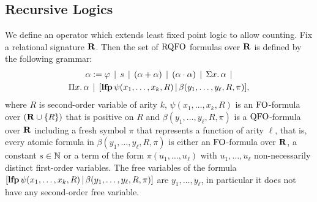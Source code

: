 \subsection{Recursive Logics}

We define an operator which extends least fixed point logic \cite{I86,vardi1982complexity} to allow counting. 
Fix a relational signature $\mathbf{R}$. Then the set of ${\rm RQFO}$ formulas over $\mathbf{R}$ is defined by the following grammar:
\begin{multline*}
	\alpha := \varphi \, \mid \, s \, \mid \, (\alpha + \alpha) \, \mid\, (\alpha \cdot \alpha) \, \mid \, 
	\Sigma{x}.\, \alpha \, \mid\\ 
	\Pi{x}.\, \alpha \, \mid\,
	[{\bf lfp} \, \psi(x_1,\ldots,x_k,R) \, | \, \beta(y_1, \ldots, y_\ell, R, \pi)],
\end{multline*}
where $R$ is second-order variable of arity $k$, $\psi(x_1, \ldots, x_k, R)$ is an ${\rm FO}$-formula over $(\mathbf{R} \cup \{R\})$ that is positive on $R$ and $\beta(y_1, \ldots, y_\ell, R, \pi)$ is a ${\rm QFO}$-formula over $\mathbf{R}$ including a fresh symbol $\pi$ that represents a function of arity $\ell$, that is, every atomic formula in $\beta(y_1, \ldots, y_\ell, R, \pi)$ is either an ${\rm FO}$-formula over $\mathbf{R}$, a constant $s \in \mathbb{N}$ or a term of the form $\pi(u_1, \ldots, u_\ell)$ with $u_1, \ldots, u_\ell$ non-necessarily distinct first-order variables. 
The free variables of the formula $[{\bf lfp} \, \psi(x_1,\ldots,x_k,R) \, | \, \beta(y_1, \ldots, y_\ell, R, \pi)]$
are $y_1, \ldots, y_\ell$, in particular it does not have any second-order free variable.

